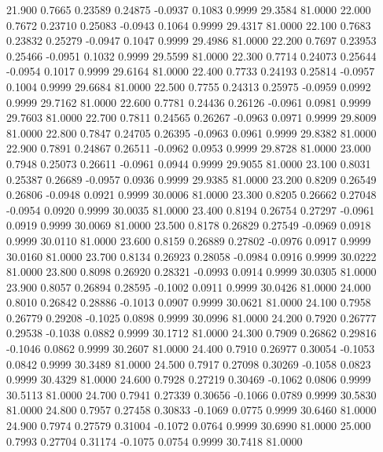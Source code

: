   21.900   0.7665   0.23589   0.24875  -0.0937   0.1083   0.9999  29.3584  81.0000
  22.000   0.7672   0.23710   0.25083  -0.0943   0.1064   0.9999  29.4317  81.0000
  22.100   0.7683   0.23832   0.25279  -0.0947   0.1047   0.9999  29.4986  81.0000
  22.200   0.7697   0.23953   0.25466  -0.0951   0.1032   0.9999  29.5599  81.0000
  22.300   0.7714   0.24073   0.25644  -0.0954   0.1017   0.9999  29.6164  81.0000
  22.400   0.7733   0.24193   0.25814  -0.0957   0.1004   0.9999  29.6684  81.0000
  22.500   0.7755   0.24313   0.25975  -0.0959   0.0992   0.9999  29.7162  81.0000
  22.600   0.7781   0.24436   0.26126  -0.0961   0.0981   0.9999  29.7603  81.0000
  22.700   0.7811   0.24565   0.26267  -0.0963   0.0971   0.9999  29.8009  81.0000
  22.800   0.7847   0.24705   0.26395  -0.0963   0.0961   0.9999  29.8382  81.0000
  22.900   0.7891   0.24867   0.26511  -0.0962   0.0953   0.9999  29.8728  81.0000
  23.000   0.7948   0.25073   0.26611  -0.0961   0.0944   0.9999  29.9055  81.0000
  23.100   0.8031   0.25387   0.26689  -0.0957   0.0936   0.9999  29.9385  81.0000
  23.200   0.8209   0.26549   0.26806  -0.0948   0.0921   0.9999  30.0006  81.0000
  23.300   0.8205   0.26662   0.27048  -0.0954   0.0920   0.9999  30.0035  81.0000
  23.400   0.8194   0.26754   0.27297  -0.0961   0.0919   0.9999  30.0069  81.0000
  23.500   0.8178   0.26829   0.27549  -0.0969   0.0918   0.9999  30.0110  81.0000
  23.600   0.8159   0.26889   0.27802  -0.0976   0.0917   0.9999  30.0160  81.0000
  23.700   0.8134   0.26923   0.28058  -0.0984   0.0916   0.9999  30.0222  81.0000
  23.800   0.8098   0.26920   0.28321  -0.0993   0.0914   0.9999  30.0305  81.0000
  23.900   0.8057   0.26894   0.28595  -0.1002   0.0911   0.9999  30.0426  81.0000
  24.000   0.8010   0.26842   0.28886  -0.1013   0.0907   0.9999  30.0621  81.0000
  24.100   0.7958   0.26779   0.29208  -0.1025   0.0898   0.9999  30.0996  81.0000
  24.200   0.7920   0.26777   0.29538  -0.1038   0.0882   0.9999  30.1712  81.0000
  24.300   0.7909   0.26862   0.29816  -0.1046   0.0862   0.9999  30.2607  81.0000
  24.400   0.7910   0.26977   0.30054  -0.1053   0.0842   0.9999  30.3489  81.0000
  24.500   0.7917   0.27098   0.30269  -0.1058   0.0823   0.9999  30.4329  81.0000
  24.600   0.7928   0.27219   0.30469  -0.1062   0.0806   0.9999  30.5113  81.0000
  24.700   0.7941   0.27339   0.30656  -0.1066   0.0789   0.9999  30.5830  81.0000
  24.800   0.7957   0.27458   0.30833  -0.1069   0.0775   0.9999  30.6460  81.0000
  24.900   0.7974   0.27579   0.31004  -0.1072   0.0764   0.9999  30.6990  81.0000
  25.000   0.7993   0.27704   0.31174  -0.1075   0.0754   0.9999  30.7418  81.0000
